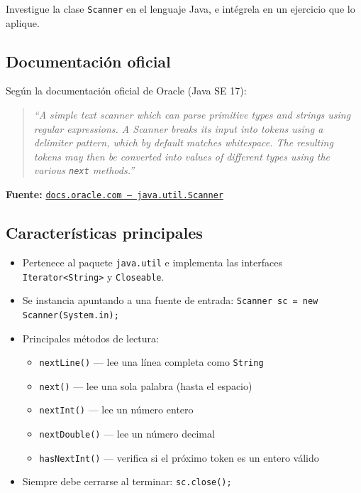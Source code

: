 
Investigue la clase \texttt{Scanner} en el lenguaje Java, e int\'egrela en un ejercicio que lo aplique.

\subsection*{Documentaci\'on oficial}

Seg\'un la documentaci\'on oficial de Oracle (Java SE 17):

\begin{quote}
\textit{``A simple text scanner which can parse primitive types and strings using
regular expressions. A Scanner breaks its input into tokens using a delimiter
pattern, which by default matches whitespace. The resulting tokens may then be
converted into values of different types using the various \texttt{next} methods.''}
\end{quote}

\textbf{Fuente:} \href{https://docs.oracle.com/en/java/javase/17/docs/api/java.base/java/util/Scanner.html}{\texttt{docs.oracle.com --- java.util.Scanner}}

\subsection*{Caracter\'isticas principales}

\begin{itemize}[itemsep=0.3em]
    \item Pertenece al paquete \texttt{java.util} e implementa las interfaces
          \texttt{Iterator<String>} y \texttt{Closeable}.
    \item Se instancia apuntando a una fuente de entrada:
          \texttt{Scanner sc = new Scanner(System.in);}
    \item Principales m\'etodos de lectura:
    \begin{itemize}[itemsep=0.2em]
        \item \texttt{nextLine()} --- lee una l\'inea completa como \texttt{String}
        \item \texttt{next()} --- lee una sola palabra (hasta el espacio)
        \item \texttt{nextInt()} --- lee un n\'umero entero
        \item \texttt{nextDouble()} --- lee un n\'umero decimal
        \item \texttt{hasNextInt()} --- verifica si el pr\'oximo token es un entero v\'alido
    \end{itemize}
    \item Siempre debe cerrarse al terminar: \texttt{sc.close();}
\end{itemize}

